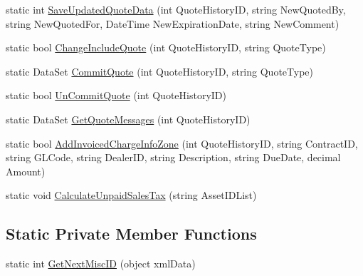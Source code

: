 \begin{DoxyCompactItemize}
\item 
static int \mbox{\hyperlink{class_g_f_s_c_1_1_services_1_1_end_of_term_1_1_business_1_1_quote_information_addf81d446292ceb91b9d98db9cf07191}{Save\+Updated\+Quote\+Data}} (int Quote\+History\+ID, string New\+Quoted\+By, string New\+Quoted\+For, Date\+Time New\+Expiration\+Date, string New\+Comment)
\item 
static bool \mbox{\hyperlink{class_g_f_s_c_1_1_services_1_1_end_of_term_1_1_business_1_1_quote_information_a2d65a66bd7a0a47c3ff3386cca19da22}{Change\+Include\+Quote}} (int Quote\+History\+ID, string Quote\+Type)
\item 
static Data\+Set \mbox{\hyperlink{class_g_f_s_c_1_1_services_1_1_end_of_term_1_1_business_1_1_quote_information_a54426a5a7c6347e1cf8010437e6913f5}{Commit\+Quote}} (int Quote\+History\+ID, string Quote\+Type)
\item 
static bool \mbox{\hyperlink{class_g_f_s_c_1_1_services_1_1_end_of_term_1_1_business_1_1_quote_information_a72c63c3508511b362a073bbefb001992}{Un\+Commit\+Quote}} (int Quote\+History\+ID)
\item 
static Data\+Set \mbox{\hyperlink{class_g_f_s_c_1_1_services_1_1_end_of_term_1_1_business_1_1_quote_information_a3dd309d2f414a21754fe4873ec8657c5}{Get\+Quote\+Messages}} (int Quote\+History\+ID)
\item 
static bool \mbox{\hyperlink{class_g_f_s_c_1_1_services_1_1_end_of_term_1_1_business_1_1_quote_information_ac9c7044adf8240f88acd089eef7257f6}{Add\+Invoiced\+Charge\+Info\+Zone}} (int Quote\+History\+ID, string Contract\+ID, string G\+L\+Code, string Dealer\+ID, string Description, string Due\+Date, decimal Amount)
\item 
static void \mbox{\hyperlink{class_g_f_s_c_1_1_services_1_1_end_of_term_1_1_business_1_1_quote_information_a7dd78540ce884730d4d6f8e9d3b3e6a1}{Calculate\+Unpaid\+Sales\+Tax}} (string Asset\+I\+D\+List)
\end{DoxyCompactItemize}
\subsection*{Static Private Member Functions}
\begin{DoxyCompactItemize}
\item 
static int \mbox{\hyperlink{class_g_f_s_c_1_1_services_1_1_end_of_term_1_1_business_1_1_quote_information_a5f2044beac69eccd10a772590f5d72ea}{Get\+Next\+Misc\+ID}} (object xml\+Data)
\end{DoxyCompactItemize}


